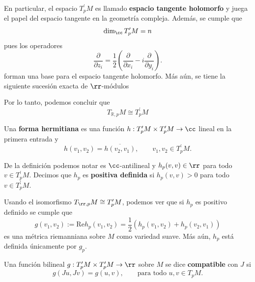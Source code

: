 En particular, el espacio $T_{p}^\prime M$ es llamado \textbf{espacio tangente holomorfo} y juega el papel del espacio tangente en la geometría compleja. Además, se cumple que
\begin{equation*}
	\dim_{\cc} T_{p}^\prime M=n
\end{equation*}
pues los operadores 
\begin{equation*}
	\frac{\partial }{\partial z_i}=\frac{1}{2}\left( \frac{\partial }{\partial x_i}-i\frac{\partial }{\partial y_i}\right).
\end{equation*}
forman una base para el espacio tangente holomorfo. Más aún, se tiene la siguiente sucesión exacta de $\rr$-módulos
\begin{center}
\end{center}
Por lo tanto, podemos concluir que
\begin{equation*}
	T_{\mathbb{R},p}M\cong T_p^\prime M
\end{equation*}
\begin{definition}
	Una \textbf{forma hermitiana} es una función $h:T^\prime_pM\times T^\prime_pM\to\cc$ lineal en la primera entrada y 
	\begin{equation*}
		h(v_1,v_2)=\overline{h(v_2,v_1)},\qquad v_1,v_2\in T^\prime_pM.
	\end{equation*}
\end{definition}
De la definición podemos notar es $\cc$-antilineal y $h_p(v,v)\in\rr$ para todo $v\in T^\prime_pM$. Decimos que $h_p$ es \textbf{positiva definida} si $h_p(v,v)>0$ para todo $v\in T^\prime_pM$.

Usando el isomorfismo $T_{\rr,p}M\cong T^\prime_pM$, podemos ver que si $h_p$ es positivo definido se cumple que
\begin{equation*}
	g(v_1,v_2):=\mathrm{Re}h_p(v_1,v_2)=\frac{1}{2}(h_p(v_1,v_2)+h_p(v_2,v_1))
\end{equation*}
es una métrica riemanniana sobre $M$ como variedad suave. Más aún, $h_p$ está definida únicamente por $g_p$.

\begin{definition}
	Una función bilineal $g:T^\prime_pM\times T^\prime_pM\to\rr$ sobre $M$ se dice \textbf{compatible} con $J$ si
	\begin{equation*}
		g(Ju,Jv)=g(u,v),\qquad\text{para todo }u,v\in T_pM.
	\end{equation*}
\end{definition}


